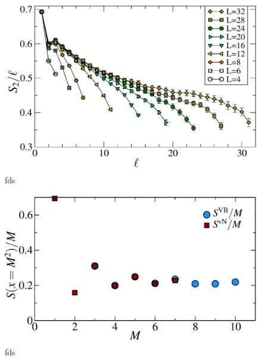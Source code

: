 \begin{figure} {
	\includegraphics[width=5in]{./figures/paper2/fig_AreaL/fig4.pdf} 
	\centering
	\caption[fds]{ fds
	\label{2Dfig}
	}
} \end{figure}

\begin{figure} {
	\centering
	\includegraphics[width=5in]{./figures/made/marea.pdf} 
	\caption[fds]{ fds
	\label{2Dbetter}
	}
} \end{figure}
